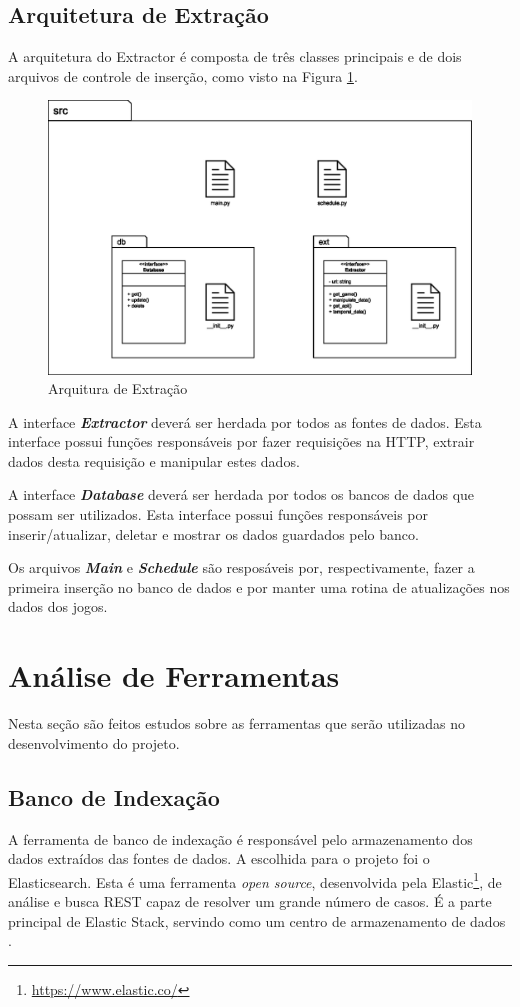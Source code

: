 \subsection{Arquitetura de Extração}
A arquitetura do Extractor é composta de três classes principais e de dois arquivos de controle de inserção, como visto na Figura \ref{image:extractor}.
\begin{figure} [H]
\centering
\includegraphics[scale=0.5]{figuras/arquiteturaExtractor.eps}
\caption{Arquitura de Extração}
\label{image:extractor}
\end{figure}
A interface \textit{\textbf{Extractor}} deverá ser herdada por todos as fontes de dados. Esta interface possui funções responsáveis por fazer requisições na HTTP, extrair dados desta requisição e manipular estes dados.

A interface \textit{\textbf{Database}} deverá ser herdada por todos os bancos de dados que possam ser utilizados. Esta interface possui funções responsáveis por inserir/atualizar, deletar e mostrar os dados guardados pelo banco.

Os arquivos \textit{\textbf{Main}} e \textit{\textbf{Schedule}} são resposáveis por, respectivamente, fazer a primeira inserção no banco de dados e por manter uma rotina de atualizações nos dados dos jogos.

\section{Análise de Ferramentas}
Nesta seção são feitos estudos sobre as ferramentas que serão utilizadas no desenvolvimento do projeto.
\subsection{Banco de Indexação}
A ferramenta de banco de indexação é responsável pelo armazenamento dos dados extraídos das fontes de dados. A escolhida para o projeto foi o Elasticsearch. Esta é uma ferramenta \textit{open source}, desenvolvida pela Elastic\footnote[1]{\url{https://www.elastic.co/}}, de análise e busca REST capaz de resolver um grande número de casos. É a parte principal de Elastic Stack, servindo como um centro de armazenamento de dados \cite{elasticsearch}.

